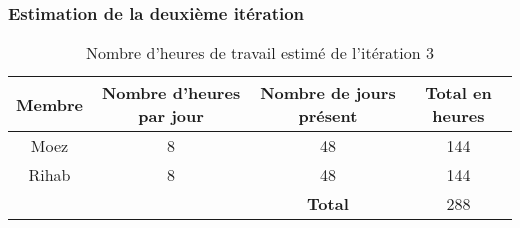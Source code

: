 \subsubsection{Estimation de la deuxième itération}
\begin{table}[htbp]
    \centering
    \begin{tabular}{| c | c | c | c |}
\hline
\textbf{Membre} & \textbf{Nombre d'heures par jour} & \textbf{Nombre de jours présent} & \textbf{Total en heures} \\ \hline
\hline

Moez & 8 & 48 & 144\\ \hline
Rihab & 8 & 48 & 144 \\ \hline
\multicolumn{2}{c|}{} & \textbf{Total} & 288 \\ \cline{3-4}
    \end{tabular}
    \caption{Nombre d'heures de travail estimé de l'itération 3}
    \label{tab:sprint3-capacity}
\end{table}

